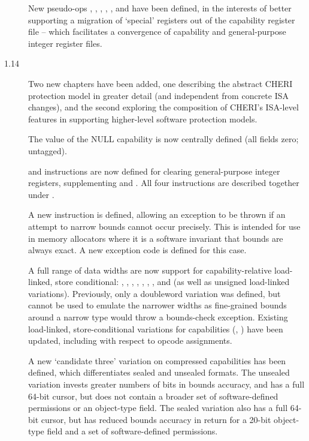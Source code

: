 \begin{description}
  New pseudo-ops , ,
  , , , and
   have been defined, in the interests of better
  supporting a migration of `special' registers out of the capability register
  file -- which facilitates a convergence of capability and general-purpose
  integer register files.

\item[1.14]
  Two new chapters have been added, one describing the abstract CHERI
  protection model in greater detail (and independent from concrete ISA
  changes), and the second exploring the composition of CHERI's ISA-level
  features in supporting higher-level software protection models.

  The value of the NULL capability is now centrally defined (all fields zero;
  untagged).

   and  instructions are now
  defined for clearing general-purpose integer registers, supplementing
   and .
  All four instructions are described together under .

  A new  instruction is defined, allowing an
  exception to be thrown if an attempt to narrow bounds cannot occur
  precisely.
  This is intended for use in memory allocators where it is a software
  invariant that bounds are always exact.
  A new exception code is defined for this case.

  A full range of data widths are now support for capability-relative
  load-linked, store conditional: , ,
  , , ,
  , , and  (as well as
  unsigned load-linked variations).
  Previously, only a doubleword variation was defined, but cannot be used to
  emulate the narrower widths as fine-grained bounds around a narrow type
  would throw a bounds-check exception.
  Existing load-linked, store-conditional variations for capabilities
  (, ) have been updated, including with
  respect to opcode assignments.

  A new `candidate three' variation on compressed capabilities has been
  defined, which differentiates sealed and unsealed formats.
  The unsealed variation invests greater numbers of bits in bounds accuracy,
  and has a full 64-bit cursor, but does not contain a broader set of
  software-defined permissions or an object-type field.
  The sealed variation also has a full 64-bit cursor, but has reduced bounds
  accuracy in return for a 20-bit object-type field and a set of
  software-defined permissions.


\end{description}
